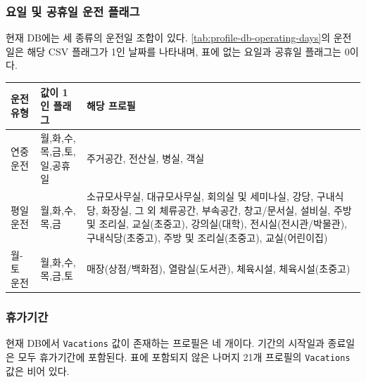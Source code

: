 \subsubsection{요일 및 공휴일 운전 플래그}

현재 DB에는 세 종류의 운전일 조합이 있다.
\cref{tab:profile-db-operating-days}의 운전일은 해당 CSV 플래그가 1인 날짜를 나타내며, 표에 없는 요일과 공휴일 플래그는 0이다.

\begin{defaulttable}
  \caption{내장 프로필 DB의 요일 및 공휴일 운전 플래그}
  \label{tab:profile-db-operating-days}
  {\small
  \renewcommand{\arraystretch}{1.12}
  \begin{tabularx}{\textwidth}{p{2.5cm}p{4.5cm}X}
    \toprule
    운전 유형 & 값이 1인 플래그 & 해당 프로필 \\ \midrule

    연중 운전
      & 월,화,수,목,금,토,일,공휴일
      & 주거공간, 전산실, 병실, 객실 \\

    평일 운전
      & 월,화,수,목,금
      & 소규모사무실, 대규모사무실, 회의실 및 세미나실,
        강당, 구내식당, 화장실, 그 외 체류공간, 부속공간,
        창고/문서실, 설비실, 주방 및 조리실, 교실(초중고),
        강의실(대학), 전시실(전시관/박물관),
        구내식당(초중고), 주방 및 조리실(초중고),
        교실(어린이집) \\

    월-토 운전
      & 월,화,수,목,금,토
      & 매장(상점/백화점), 열람실(도서관), 체육시설,
        체육시설(초중고) \\

    \bottomrule
  \end{tabularx}
  }
\end{defaulttable}

\subsubsection{휴가기간}

현재 DB에서 \texttt{Vacations} 값이 존재하는 프로필은 네 개이다. 기간의 시작일과 종료일은 모두 휴가기간에 포함된다. 표에 포함되지 않은 나머지 21개 프로필의 \texttt{Vacations} 값은 비어 있다.

